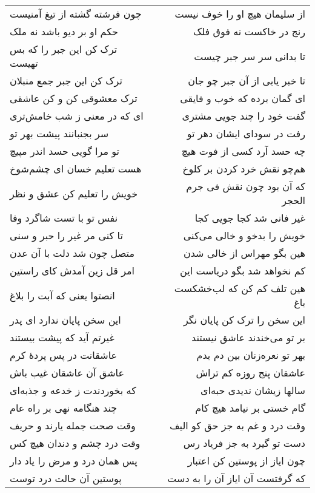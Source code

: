\begin{center}
\begin{longtable}{l p{0.5cm} r}
\\
چون فرشته گشته از تیغ آمنیست
&&
از سلیمان هیچ او را خوف نیست
\\
حکم او بر دیو باشد نه ملک
&&
رنج در خاکست نه فوق فلک
\\
ترک کن این جبر را که بس تهیست
&&
تا بدانی سر سر جبر چیست
\\
ترک کن این جبر جمع منبلان
&&
تا خبر یابی از آن جبر چو جان
\\
ترک معشوقی کن و کن عاشقی
&&
ای گمان برده که خوب و فایقی
\\
ای که در معنی ز شب خامش‌تری
&&
گفت خود را چند جویی مشتری
\\
سر بجنبانند پیشت بهر تو
&&
رفت در سودای ایشان دهر تو
\\
تو مرا گویی حسد اندر مپیچ
&&
چه حسد آرد کسی از فوت هیچ
\\
هست تعلیم خسان ای چشم‌شوخ
&&
هم‌چو نقش خرد کردن بر کلوخ
\\
خویش را تعلیم کن عشق و نظر
&&
که آن بود چون نقش فی جرم الحجر
\\
نفس تو با تست شاگرد وفا
&&
غیر فانی شد کجا جویی کجا
\\
تا کنی مر غیر را حبر و سنی
&&
خویش را بدخو و خالی می‌کنی
\\
متصل چون شد دلت با آن عدن
&&
هین بگو مهراس از خالی شدن
\\
امر قل زین آمدش کای راستین
&&
کم نخواهد شد بگو دریاست این
\\
انصتوا یعنی که آبت را بلاغ
&&
هین تلف کم کن که لب‌خشکست باغ
\\
این سخن پایان ندارد ای پدر
&&
این سخن را ترک کن پایان نگر
\\
غیرتم آید که پیشت بیستند
&&
بر تو می‌خندند عاشق نیستند
\\
عاشقانت در پس پردهٔ کرم
&&
بهر تو نعره‌زنان بین دم بدم
\\
عاشق آن عاشقان غیب باش
&&
عاشقان پنج روزه کم تراش
\\
که بخوردندت ز خدعه و جذبه‌ای
&&
سالها زیشان ندیدی حبه‌ای
\\
چند هنگامه نهی بر راه عام
&&
گام خستی بر نیامد هیچ کام
\\
وقت صحت جمله یارند و حریف
&&
وقت درد و غم به جز حق کو الیف
\\
وقت درد چشم و دندان هیچ کس
&&
دست تو گیرد به جز فریاد رس
\\
پس همان درد و مرض را یاد دار
&&
چون ایاز از پوستین کن اعتبار
\\
پوستین آن حالت درد توست
&&
که گرفتست آن ایاز آن را به دست
\\
\end{longtable}
\end{center}
